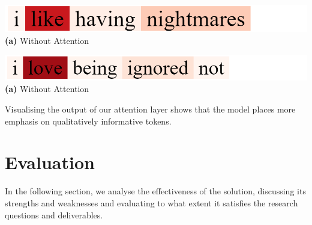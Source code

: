\documentclass[12pt,a4paper]{article}
\begin{document}
\hspace{-5pt}\begin{minipage}{0.5\textwidth}
	\begin{center}
		\hspace{-1cm}\includegraphics[width=1\textwidth]{Images/visualisation1.png}\\
		\hspace{-1cm}\textbf{(a)} Without Attention\\
	\end{center}
\end{minipage}
\hspace{-10pt}
\begin{minipage}{0.5\textwidth}
	\begin{center}
		\hspace{-1cm}\includegraphics[width=1\textwidth]{Images/visualisation2.png}\\
		\hspace{-1cm}\textbf{(a)} Without Attention\\
	\end{center}	
\end{minipage}



\noindent Visualising the output of our attention layer shows that the model places more emphasis on qualitatively informative tokens.


\section{Evaluation}
\noindent In the following section, we analyse the effectiveness of the solution, discussing its strengths and weaknesses and evaluating to what extent it satisfies the research questions and deliverables.
\end{document}
